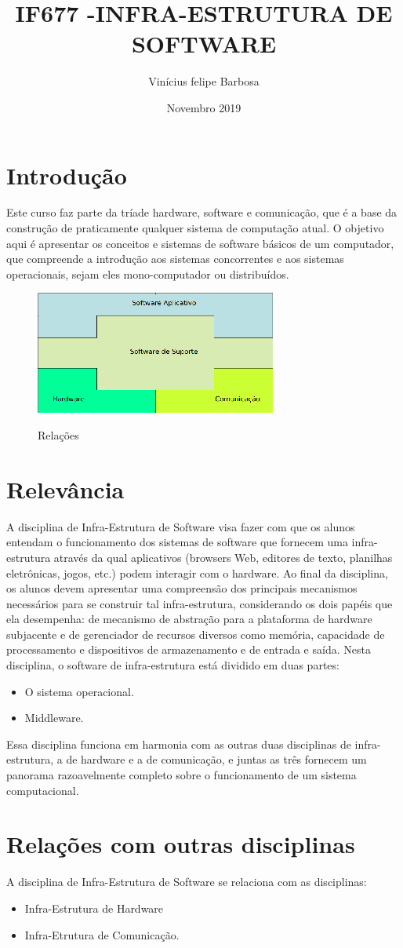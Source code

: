 \documentclass{article}
\title{IF677 -INFRA-ESTRUTURA DE SOFTWARE}
\author{Vinícius felipe Barbosa}
\date{Novembro 2019}
\begin{document}
\maketitle

\section{Introdução}
Este curso faz parte da tríade hardware, software e comunicação, que é a base da construção de praticamente qualquer sistema de computação atual. O objetivo aqui é apresentar os conceitos e sistemas de software básicos de um computador, que compreende a introdução aos sistemas concorrentes e aos sistemas operacionais, sejam eles mono-computador ou distribuídos.
\citep{chamado1}
\begin{figure}[h!]
\centering
\includegraphics[scale=1.2]{img.jpg}
\citep{chamado2}
\caption{Relações}
\label{fig: img}
\end{figure}
\section{Relevância}
A disciplina de Infra-Estrutura de Software visa fazer com que os alunos entendam o funcionamento dos sistemas de software que fornecem uma infra-estrutura através da qual aplicativos (browsers Web, editores de texto, planilhas eletrônicas, jogos, etc.) podem interagir com o hardware. Ao final da disciplina, os alunos devem apresentar uma compreensão dos principais mecanismos necessários para se construir tal infra-estrutura, considerando os dois papéis que ela desempenha: de mecanismo de abstração para a plataforma de hardware subjacente e de gerenciador de recursos diversos como memória, capacidade de processamento e dispositivos de armazenamento e de entrada e saída. Nesta disciplina, o software de infra-estrutura está dividido em duas partes: 
\begin{itemize}
\item O sistema operacional.
\item Middleware.
 \end{itemize}
 Essa disciplina funciona em harmonia com as outras duas disciplinas de infra-estrutura, a de hardware e a de comunicação, e juntas as três fornecem um panorama razoavelmente completo sobre o funcionamento de um sistema computacional.
 \citep{chamado1}
 \section{Relações com outras disciplinas}
 A disciplina de Infra-Estrutura de Software se relaciona com as disciplinas:
 \begin{itemize}
 \item Infra-Estrutura de Hardware
 \item Infra-Etrutura de Comunicação.
 \end{itemize}
 \citep{chamado3}


\end{document}
